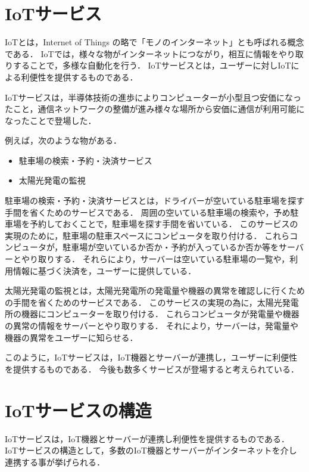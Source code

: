 \section{IoTサービス}
IoTとは，Internet of Things の略で「モノのインターネット」とも呼ばれる概念である．
IoTでは，様々な物がインターネットにつながり，相互に情報をやり取りすることで，多様な自動化を行う．
IoTサービスとは，ユーザーに対しIoTによる利便性を提供するものである．
\medskip

IoTサービスは，半導体技術の進歩によりコンピューターが小型且つ安価になったこと，通信ネットワークの整備が進み様々な場所から安価に通信が利用可能になったことで登場した．
\medskip

例えば，次のような物がある．
\begin{itemize}
	\item 駐車場の検索・予約・決済サービス\cite{エコパ}
	\item 太陽光発電の監視
\end{itemize}

駐車場の検索・予約・決済サービスとは，ドライバーが空いている駐車場を探す手間を省くためのサービスである．
周囲の空いている駐車場の検索や，予め駐車場を予約しておくことで，駐車場を探す手間を省いている．
このサービスの実現のために，駐車場の駐車スペースにコンピュータを取り付ける．
これらコンピュータが，駐車場が空いているか否か・予約が入っているか否か等をサーバーとやり取りする．
それらにより，サーバーは空いている駐車場の一覧や，利用情報に基づく決済を，ユーザーに提供している．
\medskip

太陽光発電の監視とは，太陽光発電所の発電量や機器の異常を確認しに行くための手間を省くためのサービスである．
このサービスの実現の為に，太陽光発電所の機器にコンピューターを取り付ける．
これらコンピュータが発電量や機器の異常の情報をサーバーとやり取りする．
それにより，サーバーは，発電量や機器の異常をユーザーに知らせる．
\medskip

このように，IoTサービスは，IoT機器とサーバーが連携し，ユーザーに利便性を提供するものである．
今後も数多くサービスが登場すると考えられている．

\section{IoTサービスの構造}
IoTサービスは，IoT機器とサーバーが連携し利便性を提供するものである．
IoTサービスの構造として，多数のIoT機器とサーバーがインターネットを介し連携する事が挙げられる．
\medskip

